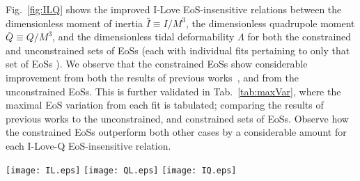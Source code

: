 \documentclass[prd,twocolumn,nofootinbib,superscriptaddress,amsmath,amssymb]{revtex4-1}
\begin{document}
Fig.~\ref{fig:ILQ} shows the improved I-Love EoS-insensitive relations between the dimensionless moment of inertia $\bar{I} \equiv I/M^3$, the dimensionless quadrupole moment $\bar{Q} \equiv Q/M^3$, and the dimensionless tidal deformability $\Lambda$ for both the constrained and unconstrained sets of EoSs (each with individual fits pertaining to only that set of EoSs {}).
We observe that the constrained EoSs show considerable improvement from both the results of previous works~\cite{Yagi:ILQ}, and from the unconstrained EoSs.
This is further validated in Tab.~\ref{tab:maxVar}, where the maximal EoS variation from each fit is tabulated; comparing the results of previous works to the unconstrained, and constrained sets of EoSs.
Observe how the constrained EoSs outperform both other cases by a considerable amount for each I-Love-Q EoS-insensitive relation.

\begin{figure*}
\begin{center} 
\texttt{[image: IL.eps]}
\texttt{[image: QL.eps]}
\texttt{[image: IQ.eps]}
\end{center}
\caption{
Individual I-Love EoS-insensitive relations $\bar{I}-\Lambda$ (left), $\bar{Q}-\Lambda$ (center), and $\bar{I}-\bar{Q}$ (right), shown for both the constrained EoSs (solid green) and unconstrained EoSs (dotted maroon).
In these figures, the black dashed lines corresponds to the fits given by Eq.~\ref{eq:ILQfitNew} (note: each panel contains individual fits for the constrained and unconstrained EoSs, indistinguishable on such a large scale).
Observe how the fractional difference from the fits, shown in the bottom panels, is greatly suppressed for the constrained case, compared to both the unconstrained case, and results from previous works~\cite{Yagi:ILQ}.
The maximal EoS variation from the fits for the unconstrained and constrained sets of EoSs are compared in Tab.~\ref{tab:maxVar}.
Additionally shown in this figure is the fractional difference from the nuclear matter fits for the 10 hybrid star EoSs (dashed green).
}
\label{fig:ILQ}
\end{figure*} 
\end{document}
